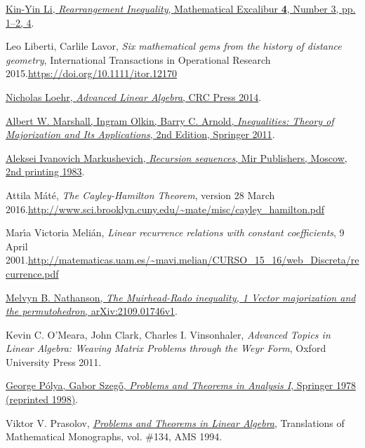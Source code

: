 \documentclass[numbers=enddot,12pt,final,onecolumn,notitlepage]{scrartcl}%
\numberwithin{exer}{subsection}
\theoremstyle{definition}
\begin{document}
\begin{thebibliography}{99999999}
%
\href{https://www.math.hkust.edu.hk/excalibur/v4_n3.pdf}{Kin-Yin Li,
\textit{Rearrangement Inequality}, Mathematical Excalibur \textbf{4}, Number
3, pp. 1--2, 4}.

Leo Liberti, Carlile Lavor, \textit{Six
mathematical gems from the history of distance geometry}, International
Transactions in Operational Research 2015.\newline\url{https://doi.org/10.1111/itor.12170}

%
\href{https://elblogdecontar.files.wordpress.com/2017/01/ebookdaraz-advanced-linear-algebra.pdf}{Nicholas
Loehr, \textit{Advanced Linear Algebra}, CRC Press 2014}.

%
\href{https://doi.org/10.1007/978-0-387-68276-1}{Albert W. Marshall, Ingram
Olkin, Barry C. Arnold, \textit{Inequalities: Theory of Majorization and Its
Applications}, 2nd Edition, Springer 2011}.

%
\href{https://archive.org/details/recursion-sequences}{Aleksei Ivanovich
Markushevich, \textit{Recursion sequences}, Mir Publishers, Moscow, 2nd
printing 1983}.

Attila M\'{a}t\'{e}, \textit{The Cayley-Hamilton
Theorem}, version 28 March 2016.\newline\url{http://www.sci.brooklyn.cuny.edu/~mate/misc/cayley_hamilton.pdf}

Mar\'{\i}a Victoria Meli\'{a}n, \textit{Linear
recurrence relations with constant coefficients}, 9 April 2001.\newline\url{http://matematicas.uam.es/~mavi.melian/CURSO_15_16/web_Discreta/recurrence.pdf}

\href{https://arxiv.org/abs/2109.01746v1}{Melvyn
B. Nathanson, \textit{The Muirhead-Rado inequality, 1 Vector majorization and
the permutohedron}, arXiv:2109.01746v1}.

Kevin C. O'Meara, John Clark, Charles I.
Vinsonhaler, \textit{Advanced Topics in Linear Algebra: Weaving Matrix
Problems through the Weyr Form}, Oxford University Press 2011.

%
\href{https://doi.org/10.1007/978-3-642-61983-0}{George P\'{o}lya, Gabor
Szeg\H{o}, \textit{Problems and Theorems in Analysis I}, Springer 1978
(reprinted 1998)}.

Viktor V. Prasolov,
\textit{\href{http://www2.math.su.se/~mleites/books/prasolov-1994-problems.pdf}{\textit{Problems
and Theorems in Linear Algebra}}}, Translations of Mathematical Monographs,
vol. \#134, AMS 1994.


\end{thebibliography}
\end{document}
